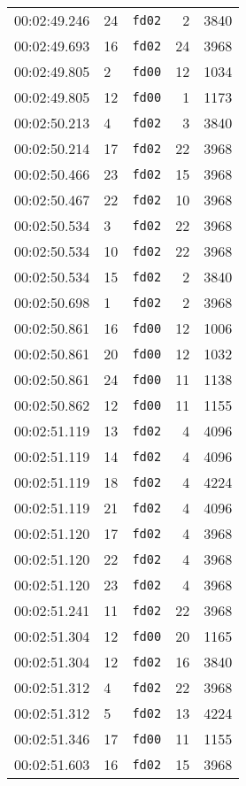 \documentclass{article}
\begin{document}
\begin{longtable}{lllrr}
00:02:49.246 & 24 & \texttt{fd02} & 2 & 3840 \\
00:02:49.693 & 16 & \texttt{fd02} & 24 & 3968 \\
00:02:49.805 & 2 & \texttt{fd00} & 12 & 1034 \\
00:02:49.805 & 12 & \texttt{fd00} & 1 & 1173 \\
00:02:50.213 & 4 & \texttt{fd02} & 3 & 3840 \\
00:02:50.214 & 17 & \texttt{fd02} & 22 & 3968 \\
00:02:50.466 & 23 & \texttt{fd02} & 15 & 3968 \\
00:02:50.467 & 22 & \texttt{fd02} & 10 & 3968 \\
00:02:50.534 & 3 & \texttt{fd02} & 22 & 3968 \\
00:02:50.534 & 10 & \texttt{fd02} & 22 & 3968 \\
00:02:50.534 & 15 & \texttt{fd02} & 2 & 3840 \\
00:02:50.698 & 1 & \texttt{fd02} & 2 & 3968 \\
00:02:50.861 & 16 & \texttt{fd00} & 12 & 1006 \\
00:02:50.861 & 20 & \texttt{fd00} & 12 & 1032 \\
00:02:50.861 & 24 & \texttt{fd00} & 11 & 1138 \\
00:02:50.862 & 12 & \texttt{fd00} & 11 & 1155 \\
00:02:51.119 & 13 & \texttt{fd02} & 4 & 4096 \\
00:02:51.119 & 14 & \texttt{fd02} & 4 & 4096 \\
00:02:51.119 & 18 & \texttt{fd02} & 4 & 4224 \\
00:02:51.119 & 21 & \texttt{fd02} & 4 & 4096 \\
00:02:51.120 & 17 & \texttt{fd02} & 4 & 3968 \\
00:02:51.120 & 22 & \texttt{fd02} & 4 & 3968 \\
00:02:51.120 & 23 & \texttt{fd02} & 4 & 3968 \\
00:02:51.241 & 11 & \texttt{fd02} & 22 & 3968 \\
00:02:51.304 & 12 & \texttt{fd00} & 20 & 1165 \\
00:02:51.304 & 12 & \texttt{fd02} & 16 & 3840 \\
00:02:51.312 & 4 & \texttt{fd02} & 22 & 3968 \\
00:02:51.312 & 5 & \texttt{fd02} & 13 & 4224 \\
00:02:51.346 & 17 & \texttt{fd00} & 11 & 1155 \\
00:02:51.603 & 16 & \texttt{fd02} & 15 & 3968 \\

\end{longtable}
\end{document}
